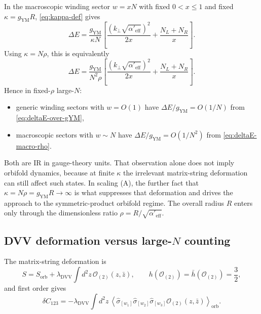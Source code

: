 \documentclass[11pt]{article}
\newcommand{\mc}[1]{\mathcal{#1}}
\newcommand{\Aeff}{\alpha'_{\mathrm{eff}}}
\begin{document}
In the macroscopic winding sector $w=xN$ with fixed $0<x\le 1$ and fixed $\kappa=g_{\mathrm{YM}}R$, \eqref{eq:kappa-def} gives
\begin{equation}
\Delta E
=
\frac{g_{\mathrm{YM}}}{\kappa N}
\left[
\frac{(k_\perp\sqrt{\Aeff})^2}{2x}
 +\frac{N_L+N_R}{x}
\right].
\end{equation}
Using $\kappa=N\rho$, this is equivalently
\begin{equation}\label{eq:deltaE-macro-rho}
\Delta E
=
\frac{g_{\mathrm{YM}}}{N^2\rho}
\left[
\frac{(k_\perp\sqrt{\Aeff})^2}{2x}
+\frac{N_L+N_R}{x}
\right].
\end{equation}
Hence in fixed-$\rho$ large-$N$:
\begin{itemize}
\item generic winding sectors with $w=O(1)$ have $\Delta E/g_{\mathrm{YM}}=O(1/N)$ from \eqref{eq:deltaE-over-gYM},
\item macroscopic sectors with $w\sim N$ have $\Delta E/g_{\mathrm{YM}}=O(1/N^2)$ from \eqref{eq:deltaE-macro-rho}.
\end{itemize}
Both are IR in gauge-theory units. That observation alone does not imply
orbifold dynamics, because at finite $\kappa$ the irrelevant matrix-string
deformation can still affect such states. In scaling (A), the further fact that
$\kappa=N\rho=g_{\mathrm{YM}}R\to\infty$ is what suppresses that deformation and
drives the approach to the symmetric-product orbifold regime. The overall
radius $R$ enters only through the dimensionless ratio $\rho=R/\sqrt{\Aeff}$.

\subsection{DVV deformation versus large-\texorpdfstring{$N$}{N} counting}
The matrix-string deformation is
\begin{equation}\label{eq:dvv}
S=S_{\mathrm{orb}}+\lambda_{\mathrm{DVV}}\int d^2z\,\mc O_{(2)}(z,\bar z),
\qquad
h(\mc O_{(2)})=\bar h(\mc O_{(2)})=\frac{3}{2},
\end{equation}
and first order gives
\begin{equation}\label{eq:dvv-first}
\delta C_{123}
=
-\lambda_{\mathrm{DVV}}
\int d^2z\,
\left\langle
\widehat{\sigma}_{[w_1]}\widehat{\sigma}_{[w_2]}\widehat{\sigma}_{[w_3]}
\mc O_{(2)}(z,\bar z)
\right\rangle_{\mathrm{orb}}.
\end{equation}
\end{document}
